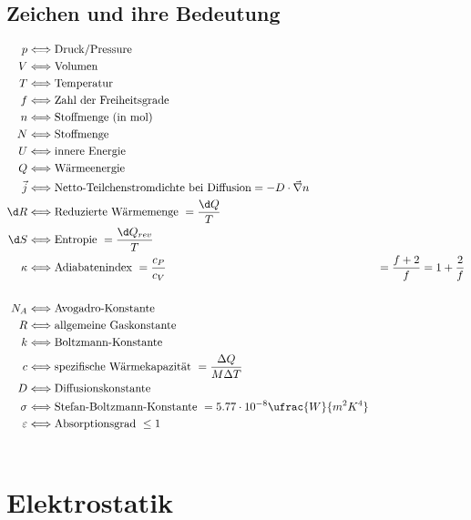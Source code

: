 \documentclass[11pt,letterpaper]{article}
\begin{document}
\subsection{Zeichen und ihre Bedeutung}
\begin{align*}
    p &\Longleftrightarrow \text{Druck/Pressure}\\
    V &\Longleftrightarrow \text{Volumen}\\
    T &\Longleftrightarrow \text{Temperatur}\\
    f &\Longleftrightarrow \text{Zahl der Freiheitsgrade}\\
    n &\Longleftrightarrow \text{Stoffmenge (in mol)}\\
    N &\Longleftrightarrow \text{Stoffmenge}\\
    U &\Longleftrightarrow \text{innere Energie}\\
    Q &\Longleftrightarrow \text{Wärmeenergie}\\
    \vec{j} &\Longleftrightarrow \text{Netto-Teilchenstromdichte bei Diffusion} = -D\cdot \vec{\nabla}n\\
    \d R &\Longleftrightarrow \text{Reduzierte Wärmemenge} \ = \frac{\d Q}{T}\\
    \d S &\Longleftrightarrow \text{Entropie} \ = \frac{\d Q_{rev}}{T}\\
    \kappa &\Longleftrightarrow \text{Adiabatenindex} \ = \frac{c_P}{c_V} &= \frac{f+2}{f}=1+\frac{2}{f}\\
    \\
    N_A &\Longleftrightarrow \text{Avogadro-Konstante}\\
    R &\Longleftrightarrow \text{allgemeine Gaskonstante}\\
    k &\Longleftrightarrow \text{Boltzmann-Konstante}\\
    c &\Longleftrightarrow \text{spezifische Wärmekapazität}\ = \frac{\Delta Q}{M\Delta T}\\
    D &\Longleftrightarrow \text{Diffusionskonstante}\\
    \sigma &\Longleftrightarrow \text{Stefan-Boltzmann-Konstante}\ = 5.77\cdot 10^{-8}\ufrac{W}{m^2K^4}\\
    \varepsilon &\Longleftrightarrow \text{Absorptionsgrad}\ \le 1\\\\
\end{align*}

\section{Elektrostatik}
\end{document}
